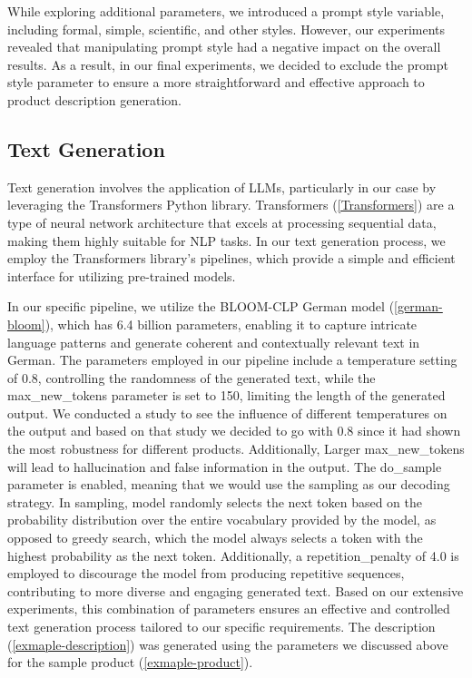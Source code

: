 While exploring additional parameters, we introduced a prompt style variable, including formal, simple, scientific, and other styles. However, our experiments revealed that manipulating prompt style had a negative impact on the overall results. As a result, in our final experiments, we decided to exclude the prompt style parameter to ensure a more straightforward and effective approach to product description generation.


\subsection{Text Generation}


Text generation involves the application of LLMs, particularly in our case by leveraging the Transformers Python library. Transformers (\autoref{Transformers}) are a type of neural network architecture that excels at processing sequential data, making them highly suitable for NLP tasks. In our text generation process, we employ the Transformers library's pipelines, which provide a simple and efficient interface for utilizing pre-trained models.

In our specific pipeline, we utilize the BLOOM-CLP German model (\autoref{german-bloom}), which has 6.4 billion parameters, enabling it to capture intricate language patterns and generate coherent and contextually relevant text in German. The parameters employed in our pipeline include a temperature setting of 0.8, controlling the randomness of the generated text, while the max\_new\_tokens parameter is set to 150, limiting the length of the generated output. We conducted a study to see the influence of different temperatures on the output and based on that study we decided to go with 0.8 since it had shown the most robustness for different products. Additionally, Larger max\_new\_tokens will lead to hallucination and false information in the output. The do\_sample parameter is enabled, meaning that we would use the sampling as our decoding strategy. In sampling, model randomly selects the next token based on the probability distribution over the entire vocabulary provided by the model, as opposed to greedy search, which the model always selects a token with the highest probability as the next token. Additionally, a repetition\_penalty of 4.0 is employed to discourage the model from producing repetitive sequences, contributing to more diverse and engaging generated text. Based on our extensive experiments, this combination of parameters ensures an effective and controlled text generation process tailored to our specific requirements. The description (\autoref{exmaple-description}) was generated using the parameters we discussed above for the sample product (\autoref{exmaple-product}).

